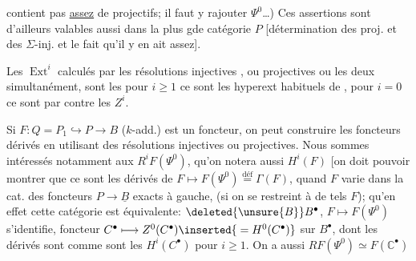 contient pas \uline{assez} de \inserted{$\Sigma$-}projectifs; il faut y rajouter $\Psi^0$\ldots)  Ces  assertions sont d'ailleurs valables aussi dans la plus gde catégorie $P$ [détermination des \inserted{$\Sigma$-}proj. et des $\Sigma$-inj. et le fait qu'il y en ait assez].

Les $\operatorname{Ext}^{i}$ calculés par les résolutions injectives , ou projectives   ou les deux simultanément, sont les  pour $i\geq1$ ce sont les hyperext habituels de , pour $i=0$ ce sont par contre les $Z^i$.

Si $F:Q=P_1\hookrightarrow P\longrightarrow B$ ($k$-add.) est un foncteur, on peut construire les foncteurs dérivés  en utilisant des résolutions injectives ou projectives. Nous sommes intéressés notamment aux $R^iF(\Psi^0)$, qu'on notera aussi $H^i(F)$ [on doit pouvoir montrer que ce sont les dérivés  de $F\longmapsto F(\Psi^0)\overset{\mathrm{déf}}{=}\Gamma(F)$, quand $F$ varie dans la cat. des foncteurs  $P\longrightarrow \underline{B}$ \inserted{$\Sigma$-}exacts à gauche, (si on se restreint à de tels $F$); qu'en effet cette catégorie est équivalente:  $\deleted{\unsure{B}} B^{\bullet}$, $F\longmapsto F(\Psi^0)$ s'identifie,  foncteur $C^{\bullet}\longmapsto Z^0(C^{\bullet})\inserted{{}=H^0(C^{\bullet})}$ sur $B^{\bullet}$, dont les dérivés sont comme sont les $H^i(C^{\bullet})$ pour $i\geq1$. On a aussi $RF(\Psi^0)\simeq F(\mathbb{C}^{\bullet})$
